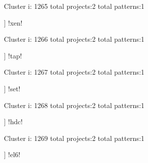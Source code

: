 Cluster i: 1265
total projects:2
total patterns:1
\begin{multicols}{1}
\begin{description}[noitemsep,topsep=0pt]
\item [[2] ] \cverb!xen!
\end{description}
\end{multicols}







Cluster i: 1266
total projects:2
total patterns:1
\begin{multicols}{1}
\begin{description}[noitemsep,topsep=0pt]
\item [[2] ] \cverb!tap!
\end{description}
\end{multicols}







Cluster i: 1267
total projects:2
total patterns:1
\begin{multicols}{1}
\begin{description}[noitemsep,topsep=0pt]
\item [[2] ] \cverb!set!
\end{description}
\end{multicols}







Cluster i: 1268
total projects:2
total patterns:1
\begin{multicols}{1}
\begin{description}[noitemsep,topsep=0pt]
\item [[2] ] \cverb!hdc!
\end{description}
\end{multicols}







Cluster i: 1269
total projects:2
total patterns:1
\begin{multicols}{1}
\begin{description}[noitemsep,topsep=0pt]
\item [[2] ] \cverb!el6!
\end{description}
\end{multicols}







